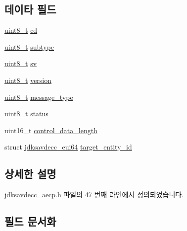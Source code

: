 \subsection*{데이타 필드}
\begin{DoxyCompactItemize}
\item 
\hyperlink{stdint_8h_aba7bc1797add20fe3efdf37ced1182c5}{uint8\+\_\+t} \hyperlink{structjdksavdecc__aecpdu__common__control__header_a8bdacfca3faaf5f7d020bbe533855525}{cd}
\item 
\hyperlink{stdint_8h_aba7bc1797add20fe3efdf37ced1182c5}{uint8\+\_\+t} \hyperlink{structjdksavdecc__aecpdu__common__control__header_a8613e2fef78de5c8994bc1b1ce55dc2f}{subtype}
\item 
\hyperlink{stdint_8h_aba7bc1797add20fe3efdf37ced1182c5}{uint8\+\_\+t} \hyperlink{structjdksavdecc__aecpdu__common__control__header_aff36ae5f31d03185ca79d7eae0977fda}{sv}
\item 
\hyperlink{stdint_8h_aba7bc1797add20fe3efdf37ced1182c5}{uint8\+\_\+t} \hyperlink{structjdksavdecc__aecpdu__common__control__header_ab22abc2906422da61885ac6c8e6a1a59}{version}
\item 
\hyperlink{stdint_8h_aba7bc1797add20fe3efdf37ced1182c5}{uint8\+\_\+t} \hyperlink{structjdksavdecc__aecpdu__common__control__header_aeaaffeace8c23899e558022f62ce6de4}{message\+\_\+type}
\item 
\hyperlink{stdint_8h_aba7bc1797add20fe3efdf37ced1182c5}{uint8\+\_\+t} \hyperlink{structjdksavdecc__aecpdu__common__control__header_ade818037fd6c985038ff29656089758d}{status}
\item 
uint16\+\_\+t \hyperlink{structjdksavdecc__aecpdu__common__control__header_acc7cd70455e6e455ac498477b95f9e21}{control\+\_\+data\+\_\+length}
\item 
struct \hyperlink{structjdksavdecc__eui64}{jdksavdecc\+\_\+eui64} \hyperlink{structjdksavdecc__aecpdu__common__control__header_a6928214f4610ef10e95ba5c74ac5b06e}{target\+\_\+entity\+\_\+id}
\end{DoxyCompactItemize}


\subsection{상세한 설명}


jdksavdecc\+\_\+aecp.\+h 파일의 47 번째 라인에서 정의되었습니다.



\subsection{필드 문서화}
